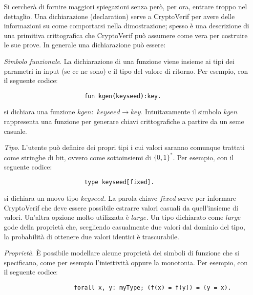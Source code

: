 \documentclass[a4paper,openright,twoside,12pt]{report}
\begin{document}
Si cercher\`a di fornire maggiori spiegazioni senza per\`o, per ora, entrare troppo nel dettaglio.
Una dichiarazione (declaration) serve a CryptoVerif per avere delle informazioni su come comportarsi nella dimostrazione; 
spesso \`e una descrizione di una primitiva crittografica che CryptoVerif pu\`o assumere come vera per costruire le sue prove.
In generale una dichiarazione pu\`o essere:
\begin{description}
 \item{\emph{Simbolo funzionale}.} La dichiarazione di una funzione viene insieme ai tipi dei parametri in input (se ce ne sono) e il tipo del valore di ritorno. Per esempio, con il seguente codice:\\
				      
				  
				      \begin{verbatim}
				       fun kgen(keyseed):key.
				      \end{verbatim}
				   
				  si dichiara una funzione $kgen:$ $keyseed\rightarrow key$. Intuitavamente il simbolo $kgen$ rappresenta una funzione per generare chiavi crittografiche a partire da un seme casuale.
 
 \item{\emph{Tipo}.} L'utente pu\`o definire dei propri tipi i cui valori saranno comunque trattati come stringhe di bit,
	    ovvero come sottoinsiemi di $\{0, 1\}^*$. Per esempio, con il seguente codice:
 

  				      \begin{verbatim}
				       type keyseed[fixed].
				      \end{verbatim}
 
				    si dichiara un nuovo tipo $keyseed$. La parola chiave $fixed$ serve per informare CryptoVerif che deve essere possibile estrarre valori casuali da quell'insieme di valori.
Un'altra opzione molto utilizzata \`e $large$. Un tipo dichiarato come $large$ gode della propriet\`a che, scegliendo casualmente due valori dal dominio del tipo, la probabilit\`a di ottenere
due valori identici \`e trascurabile.

 \item{\emph{Propriet\`a}.} \`E possibile modellare alcune propriet\`a dei simboli di funzione che si specificano, come per esempio l'iniettivit\`a oppure la
		    monotonia. Per esempio, con il seguente codice:

    				      \begin{verbatim}
				    forall x, y: myType; (f(x) = f(y)) = (y = x).
				      \end{verbatim}
 

\end{description}
\end{document}
